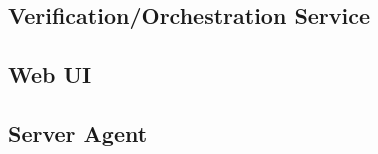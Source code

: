 \documentclass{cshonours}
\begin{document}
\subsection{Verification/Orchestration Service}
\subsection{Web UI}
\subsection{Server Agent}


\printbibliography[title=References]
% 
\end{document}

